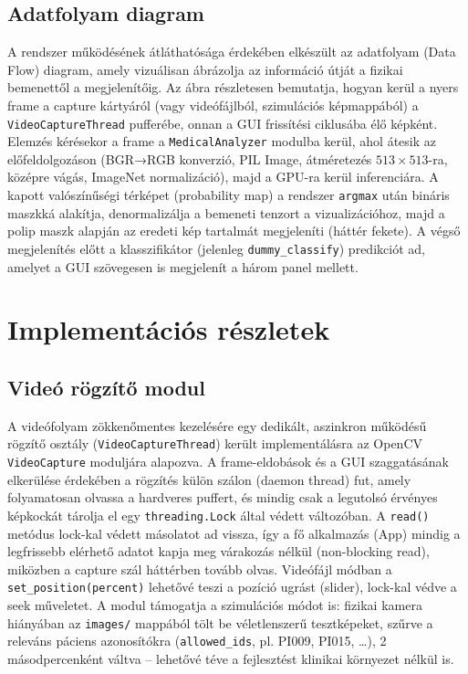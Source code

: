 \documentclass[12pt, a4paper]{report}
\begin{document}
\subsection{Adatfolyam diagram}
A rendszer működésének átláthatósága érdekében elkészült az adatfolyam (Data Flow) diagram, amely vizuálisan ábrázolja az információ útját a fizikai bemenettől a megjelenítőig. Az ábra részletesen bemutatja, hogyan kerül a nyers frame a capture kártyáról (vagy videófájlból, szimulációs képmappából) a \texttt{VideoCaptureThread} pufferébe, onnan a GUI frissítési ciklusába élő képként. Elemzés kérésekor a frame a \texttt{MedicalAnalyzer} modulba kerül, ahol átesik az előfeldolgozáson (BGR→RGB konverzió, PIL Image, átméretezés $513 \times 513$-ra, középre vágás, ImageNet normalizáció), majd a GPU-ra kerül inferenciára. A kapott valószínűségi térképet (probability map) a rendszer \texttt{argmax} után bináris maszkká alakítja, denormalizálja a bemeneti tenzort a vizualizációhoz, majd a polip maszk alapján az eredeti kép tartalmát megjeleníti (háttér fekete). A végső megjelenítés előtt a klasszifikátor (jelenleg \texttt{dummy\_classify}) predikciót ad, amelyet a GUI szövegesen is megjelenít a három panel mellett.

\section{Implementációs részletek}

\subsection{Videó rögzítő modul}
A videófolyam zökkenőmentes kezelésére egy dedikált, aszinkron működésű rögzítő osztály (\texttt{VideoCaptureThread}) került implementálásra az OpenCV \texttt{VideoCapture} moduljára alapozva. A frame-eldobások és a GUI szaggatásának elkerülése érdekében a rögzítés külön szálon (daemon thread) fut, amely folyamatosan olvassa a hardveres puffert, és mindig csak a legutolsó érvényes képkockát tárolja el egy \texttt{threading.Lock} által védett változóban. A \texttt{read()} metódus lock-kal védett másolatot ad vissza, így a fő alkalmazás (App) mindig a legfrissebb elérhető adatot kapja meg várakozás nélkül (non-blocking read), miközben a capture szál háttérben tovább olvas. Videófájl módban a \texttt{set\_position(percent)} lehetővé teszi a pozíció ugrást (slider), lock-kal védve a seek műveletet. A modul támogatja a szimulációs módot is: fizikai kamera hiányában az \texttt{images/} mappából tölt be véletlenszerű tesztképeket, szűrve a releváns páciens azonosítókra (\texttt{allowed\_ids}, pl. PI009, PI015, …), 2 másodpercenként váltva – lehetővé téve a fejlesztést klinikai környezet nélkül is.
\end{document}
